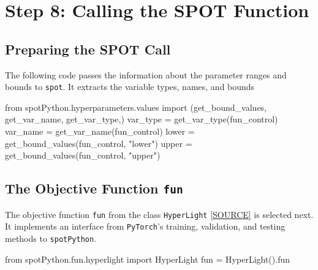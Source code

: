 \documentclass[
  letterpaper,
  DIV=11,
  numbers=noendperiod]{scrreprt}
\newenvironment{Shaded}{\begin{snugshade}}{\end{snugshade}}
\newcommand{\ImportTok}[1]{\textcolor[rgb]{0.00,0.46,0.62}{#1}}
\newcommand{\NormalTok}[1]{\textcolor[rgb]{0.00,0.23,0.31}{#1}}
\newcommand{\OperatorTok}[1]{\textcolor[rgb]{0.37,0.37,0.37}{#1}}
\newcommand{\StringTok}[1]{\textcolor[rgb]{0.13,0.47,0.30}{#1}}
\begin{document}
\hypertarget{step-8-calling-the-spot-function-6}{%
\section{Step 8: Calling the SPOT
Function}\label{step-8-calling-the-spot-function-6}}

\hypertarget{sec-prepare-spot-call-31}{%
\subsection{Preparing the SPOT Call}\label{sec-prepare-spot-call-31}}

The following code passes the information about the parameter ranges and
bounds to \texttt{spot}. It extracts the variable types, names, and
bounds

\begin{Shaded}
\begin{Highlighting}[]
\ImportTok{from}\NormalTok{ spotPython.hyperparameters.values }\ImportTok{import}\NormalTok{ (get\_bound\_values,}
\NormalTok{    get\_var\_name,}
\NormalTok{    get\_var\_type,)}
\NormalTok{var\_type }\OperatorTok{=}\NormalTok{ get\_var\_type(fun\_control)}
\NormalTok{var\_name }\OperatorTok{=}\NormalTok{ get\_var\_name(fun\_control)}
\NormalTok{lower }\OperatorTok{=}\NormalTok{ get\_bound\_values(fun\_control, }\StringTok{"lower"}\NormalTok{)}
\NormalTok{upper }\OperatorTok{=}\NormalTok{ get\_bound\_values(fun\_control, }\StringTok{"upper"}\NormalTok{)}
\end{Highlighting}
\end{Shaded}

\hypertarget{sec-the-objective-function-31}{%
\subsection{\texorpdfstring{The Objective Function
\texttt{fun}}{The Objective Function fun}}\label{sec-the-objective-function-31}}

The objective function \texttt{fun} from the class \texttt{HyperLight}
\href{https://github.com/sequential-parameter-optimization/spotPython/blob/main/src/spotPython/light/hyperlight.py}{{[}SOURCE{]}}
is selected next. It implements an interface from \texttt{PyTorch}'s
training, validation, and testing methods to \texttt{spotPython}.

\begin{Shaded}
\begin{Highlighting}[]
\ImportTok{from}\NormalTok{ spotPython.fun.hyperlight }\ImportTok{import}\NormalTok{ HyperLight}
\NormalTok{fun }\OperatorTok{=}\NormalTok{ HyperLight().fun}
\end{Highlighting}
\end{Shaded}
\end{document}
